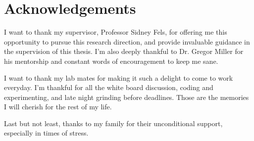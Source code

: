 
\chapter{Acknowledgements}

I want to thank my supervisor, Professor Sidney Fels, for offering me this opportunity to pursue this research direction, and provide invaluable guidance in the supervision of this thesis. I'm also deeply thankful to Dr. Gregor Miller for his mentorship and constant words of encouragement to keep me sane.

I want to thank my lab mates for making it such a delight to come to work everyday. I'm thankful for all the white board discussion, coding and experimenting, and late night grinding before deadlines. Those are the memories I will cherish for the rest of my life.

Last but not least, thanks to my family for their unconditional support, especially in times of stress.